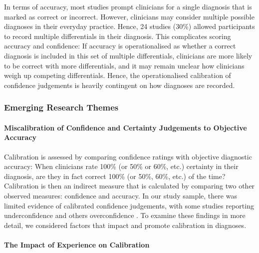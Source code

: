 \documentclass[a4paper, nobind]{templates/ociamthesis}
\begin{document}
\hfill\break
In terms of accuracy, most studies prompt clinicians for a single diagnosis that is marked as correct or incorrect. However, clinicians may consider multiple possible diagnoses in their everyday practice. Hence, 24 studies (30\%) allowed participants to record multiple differentials in their diagnosis. This complicates scoring accuracy and confidence: If accuracy is operationalised as whether a correct diagnosis is included in this set of multiple differentials, clinicians are more likely to be correct with more differentials, and it may remain unclear how clinicians weigh up competing differentials. Hence, the operationalised calibration of confidence judgements is heavily contingent on how diagnoses are recorded.

\subsubsection{Emerging Research Themes}\label{emerging-research-themes}

\paragraph{Miscalibration of Confidence and Certainty Judgements to Objective Accuracy}\label{miscalibration-of-confidence-and-certainty-judgements-to-objective-accuracy}

Calibration is assessed by comparing confidence ratings with objective diagnostic accuracy: When clinicians rate 100\% (or 50\% or 60\%, etc.) certainty in their diagnosis, are they in fact correct 100\% (or 50\%, 60\%, etc.) of the time? Calibration is then an indirect measure that is calculated by comparing two other observed measures: confidence and accuracy. In our study sample, there was limited evidence of calibrated confidence judgements, with some studies reporting underconfidence \autocite{mann_relationship_1993,yang_effect_2012,brezis_does_2019}and others overconfidence \autocite{friedman_are_2001,fernandez-aguilar_use_2022,garbayo_metacognitive_2023}. To examine these findings in more detail, we considered factors that impact and promote calibration in diagnoses.

\paragraph{The Impact of Experience on Calibration}\label{the-impact-of-experience-on-calibration}
\end{document}
